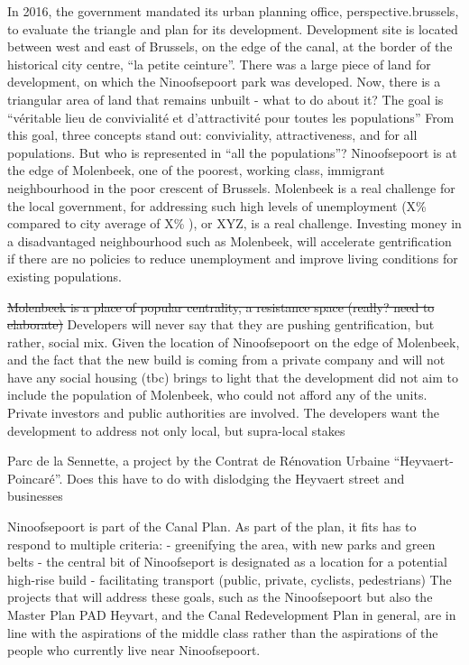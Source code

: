 \documentclass{article}[11pt]
\begin{document}
In 2016, the government mandated its urban planning office, perspective.brussels, to evaluate the triangle and plan for its development\parencite{required}.
Development site is located between west and east of Brussels, on the edge of the canal, at the border of the historical city centre, ``la petite ceinture''.
There was a large piece of land for development, on which the Ninoofsepoort park was developed. 
Now, there is a triangular area of land that remains unbuilt - what to do about it? The goal is ``véritable lieu de convivialité et d’attractivité pour toutes les populations'' \cite{perspectiveNinove}
From this goal, three concepts stand out: conviviality, attractiveness, and for all populations. But who is represented in ``all the populations''? Ninoofsepoort is at the edge of Molenbeek, one of the poorest, working class, immigrant neighbourhood in the poor crescent of Brussels. Molenbeek is a real challenge for the local government, for addressing such high levels of unemployment (X\% compared to city average of X\% \parencite{monitoring2020quartier}), or XYZ, is a real challenge. 
Investing money in a disadvantaged neighbourhood such as Molenbeek, will accelerate gentrification if there are no policies to reduce unemployment and improve living conditions for existing populations.

\sout{Molenbeek is a place of popular centrality, a resistance space (really? need to elaborate)}
Developers will never say that they are pushing gentrification, but rather, social mix. Given the location of Ninoofsepoort on the edge of Molenbeek, and the fact that the new build is coming from a private company and will not have any social housing (tbc) brings to light that the development did not aim to include the population of Molenbeek, who could not afford any of the units. 
Private investors and public authorities are involved.
The developers want the development to address not only local, but supra-local stakes

Parc de la Sennette, a project by the Contrat de Rénovation Urbaine ``Heyvaert-Poincaré''. Does this have to do with dislodging the Heyvaert street and businesses

Ninoofsepoort is part of the Canal Plan. As part of the plan, it fits has to respond to multiple criteria:\cite{diagnosticNinove}
- greenifying the area, with new parks and green belts
- the central bit of Ninoofseport is designated as a location for a potential high-rise build
- facilitating transport (public, private, cyclists, pedestrians)
The projects that will address these goals, such as the Ninoofsepoort but also the Master Plan PAD Heyvart, and the Canal Redevelopment Plan in general, are in line with the aspirations of the middle class rather than the aspirations of the people who currently live near Ninoofsepoort. 
\end{document}
